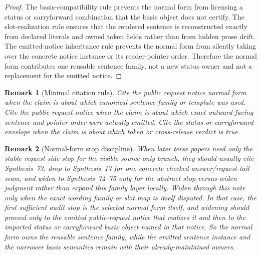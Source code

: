 \documentclass[11pt]{article}
\newtheorem{remark}{Remark}
\begin{document}
\begin{proof}
The basis-compatibility rule prevents the normal form from licensing a status or carryforward combination that the basis object does not certify.
The slot-realization rule ensures that the rendered sentence is reconstructed exactly from declared literals and owned token fields rather than from hidden prose drift.
The emitted-notice inheritance rule prevents the normal form from silently taking over the concrete notice instance or its reader-pointer order.
Therefore the normal form contributes one reusable sentence family, not a new status owner and not a replacement for the emitted notice.\qedhere
\end{proof}

\begin{remark}[Minimal citation rule]
Cite the public request notice normal form when the claim is about \emph{which canonical sentence family or template was used}.
Cite the public request notice when the claim is about \emph{which exact outward-facing sentence and pointer order were actually emitted}.
Cite the status or carryforward envelope when the claim is about \emph{which token or cross-release verdict is true}.
\end{remark}

\begin{remark}[Normal-form stop discipline]
When later terse papers need only the stable request-side stop for the visible source-only branch, they should usually cite Synthesis~73, drop to Synthesis~17 for one concrete checked-answer/request-tail seam, and widen to Synthesis~74--75 only for the abstract stop-versus-widen judgment rather than expand this family layer locally.
Widen through this note only when the exact wording family or slot map is itself disputed. In that case, the first sufficient audit stop is the selected normal form itself, and widening should proceed only to the emitted public-request notice that realizes it and then to the imported status or carryforward basis object named in that notice.
So the normal form owns the reusable sentence family, while the emitted sentence instance and the narrower basis semantics remain with their already-maintained owners.
\end{remark}
\end{document}
